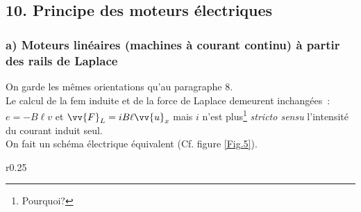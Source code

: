 \documentclass{article}
\renewcommand\overrightarrow{\vv}
\begin{document}
\subsection*{10. Principe des moteurs électriques}
\subsubsection*{a) Moteurs linéaires (machines à courant continu) à partir des rails de Laplace}
On garde les mêmes
orientations qu'au paragraphe 8. \\
Le calcul de la fem induite et de la force de Laplace demeurent
inchangées : $e = -B\ell v$ et $\overrightarrow{F}_{L} = iB\ell
\overrightarrow{u}_{x}$ mais $i$ n'est plus\footnote{Pourquoi?} \textit{stricto sensu} l'intensité du courant induit seul. \\
On fait un schéma électrique équivalent (Cf. figure \ref{Fig.5}).



\begin{wrapfigure}{r}{0.25\textwidth}
\caption{}\label{Fig.5}
\end{wrapfigure}
\end{document}
